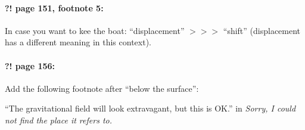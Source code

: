 \documentclass[twoside]{article}
\begin{document}
\paragraph{?! page 151, footnote 5:} In case you want to kee the boat: ``displacement'' $>\!>\!>$ ``shift'' (displacement has a different meaning in this context).

\paragraph{?! page 156:} Add the following footnote after ``below the surface'':

``The gravitational field will look extravagant, but this is OK.''
 in {\it  Sorry, I could not find the place it refers to.} 
\end{document}
